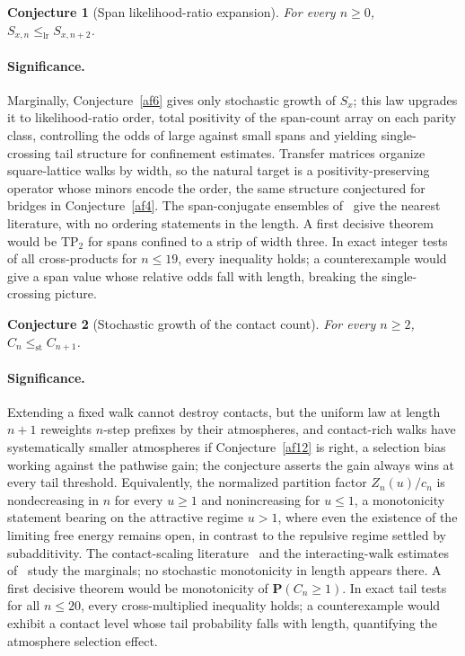 \documentclass[11pt]{article}
\newtheorem{conjecture}{Conjecture}
\theoremstyle{definition}
\begin{document}
\begin{conjecture}[Span likelihood-ratio expansion]\label{af7}
For every $n\ge0$, $S_{x,n}\le_{\mathrm{lr}}S_{x,n+2}$.
\end{conjecture}

\paragraph{Significance.}
Marginally, Conjecture~\ref{af6} gives only stochastic growth of $S_x$; this law upgrades it to likelihood-ratio order, total positivity of the span-count array on each parity class, controlling the odds of large against small spans and yielding single-crossing tail structure for confinement estimates.  Transfer matrices organize square-lattice walks by width, so the natural target is a positivity-preserving operator whose minors encode the order, the same structure conjectured for bridges in Conjecture~\ref{af4}.  The span-conjugate ensembles of~\cite{BBO25} give the nearest literature, with no ordering statements in the length.  A first decisive theorem would be TP${}_2$ for spans confined to a strip of width three.  In exact integer tests of all cross-products for $n\le19$, every inequality holds; a counterexample would give a span value whose relative odds fall with length, breaking the single-crossing picture.

\begin{conjecture}[Stochastic growth of the contact count]\label{af8}
For every $n\ge2$, $C_n\le_{\mathrm{st}}C_{n+1}$.
\end{conjecture}

\paragraph{Significance.}
Extending a fixed walk cannot destroy contacts, but the uniform law at length $n+1$ reweights $n$-step prefixes by their atmospheres, and contact-rich walks have systematically smaller atmospheres if Conjecture~\ref{af12} is right, a selection bias working against the pathwise gain; the conjecture asserts the gain always wins at every tail threshold.  Equivalently, the normalized partition factor $Z_n(u)/c_n$ is nondecreasing in $n$ for every $u\ge1$ and nonincreasing for $u\le1$, a monotonicity statement bearing on the attractive regime $u>1$, where even the existence of the limiting free energy remains open, in contrast to the repulsive regime settled by subadditivity.  The contact-scaling literature~\cite{BOS01} and the interacting-walk estimates of~\cite{BGJ20} study the marginals; no stochastic monotonicity in length appears there.  A first decisive theorem would be monotonicity of $\mathbf P(C_n\ge1)$.  In exact tail tests for all $n\le20$, every cross-multiplied inequality holds; a counterexample would exhibit a contact level whose tail probability falls with length, quantifying the atmosphere selection effect.
\end{document}
